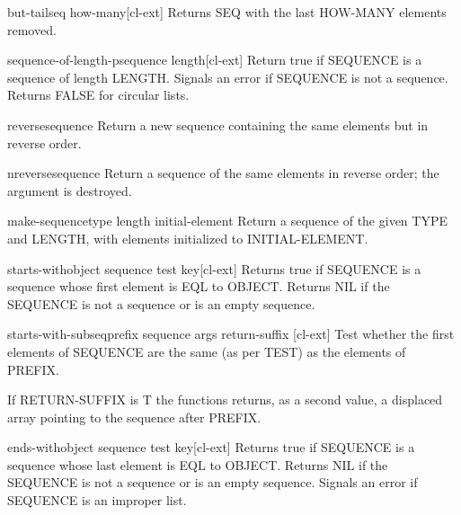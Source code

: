 \documentclass[10pt,english]{book}
\begin{document}
\begin{function}{but-tail}{seq \op how-many}[cl-ext]
  Returns SEQ with the last HOW-MANY elements removed.
\end{function}

\begin{function}{sequence-of-length-p}{sequence length}[cl-ext]
  Return true if SEQUENCE is a sequence of length LENGTH. Signals an error if
  SEQUENCE is not a sequence. Returns FALSE for circular lists.
\end{function}

\begin{function}{reverse}{sequence}
  Return a new sequence containing the same elements but in reverse order.
\end{function}

\begin{function}{nreverse}{sequence}
  Return a sequence of the same elements in reverse order; the argument
  is destroyed.
\end{function}

\begin{function}{make-sequence}{type length \key initial-element}
  Return a sequence of the given TYPE and LENGTH, with elements initialized
  to INITIAL-ELEMENT.
\end{function}

\begin{function}{starts-with}{object sequence \key test key}[cl-ext]
  Returns true if SEQUENCE is a sequence whose first element is EQL to OBJECT.
  Returns NIL if the SEQUENCE is not a sequence or is an empty sequence.
\end{function}

\begin{function}{starts-with-subseq}{prefix sequence \rest args \key return-suffix \akeys}[cl-ext]
  Test whether the first elements of SEQUENCE are the same (as per TEST) as the elements of PREFIX.

  If RETURN-SUFFIX is T the functions returns, as a second value, a
  displaced array pointing to the sequence after PREFIX.
\end{function}

\begin{function}{ends-with}{object sequence \key test key}[cl-ext]
  Returns true if SEQUENCE is a sequence whose last element is EQL to OBJECT.
  Returns NIL if the SEQUENCE is not a sequence or is an empty sequence. Signals
  an error if SEQUENCE is an improper list.
\end{function}
\end{document}
